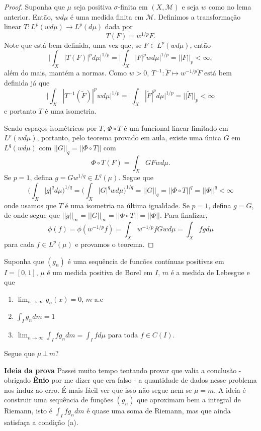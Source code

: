 \begin{proof}
    Suponha que $\mu$ seja positiva $\sigma$-finita em $(X, \mathcal{M})$ e seja $w$ como no lema anterior. Então, $wd\mu$ é uma medida
    finita em $\mathcal{M}$. Definimos a transformação linear $T: L^p(wd\mu) \to L^p(d\mu)$ dada por 
    $$T(F) = w^{1/p}F.$$
    Note que está bem definida, uma vez que, se $F \in L^p(wd\mu)$, então 
    $$\bigg|\int_X |T(F)|^p d\mu\bigg|^{1/p} = \bigg|\int_X |F|^p wd\mu\bigg|^{1/p} = ||F||_p < \infty,$$
    além do mais, mantém a normas. Como $w > 0$, $T^{-1}: \tilde{F} \mapsto w^{-1/p}\tilde{F}$ está bem definida já que 
    $$\bigg|\int_X |T^{-1}(\tilde{F})|^p wd\mu\bigg|^{1/p} = \bigg|\int_X |\tilde{F}|^p d\mu\bigg|^{1/p} = ||\tilde{F}||_p < \infty $$
    e portanto $T$ é uma isometria. 
    
    Sendo espaços isométricos por $T$, $\Phi \circ T$ é um funcional linear limitado em $L^p(wd\mu)$,
    portanto, pelo teorema provado em aula, existe uma única $G$ em $L^q(wd\mu)$ com $||G||_q = ||\Phi \circ T||$ com 
    $$\Phi \circ T (F) = \int_X GF wd\mu.$$
    Se $p = 1$, defina $g = Gw^{1/q} \in L^q(\mu)$. Segue que 
    $$\bigg(\int_X |g|^q d\mu\bigg)^{1/q} = \bigg(\int_X |G|^q w d\mu\bigg)^{1/q} = ||G||_q = ||\Phi \circ T||^q = ||\Phi||^q < \infty$$
    onde usamos que $T$ é uma isometria na última igualdade. Se $p = 1$, defina $g = G$,
    de onde segue que $||g||_\infty = ||G||_\infty = ||\Phi \circ T|| = ||\Phi||$. Para finalizar, 
    $$\phi(f) = \phi(w^{-1/p}f) = \int_X w^{-1/p}fGwd\mu = \int_X fg d\mu$$
    para cada $f \in L^p(\mu)$ e provamos o teorema.
\end{proof}

\begin{problem}
    \label{prob:l6:4}
    Suponha que $(g_n)$ é uma sequência de funcões contínuas positivas em $I = [0,1]$, $\mu$ é um medida positiva de Borel em $I$, $m$ é a medida de Lebesgue
    e que 
    \begin{enumerate}[label=(\alph*)]
        \item $\lim_{n\to\infty} g_n(x) = 0$, $m$-a.e
        \item $\int_I g_n dm = 1$
        \item $\lim_{n\to\infty} \int_I fg_ndm = \int_I fd\mu$ para toda $f \in C(I)$.
    \end{enumerate}
    Segue que $\mu\,\bot\,m$?
\end{problem}
\begin{remark}
    \textbf{Ideia da prova}
    Passei muito tempo tentando provar que valia a conclusão - obrigado \textbf{Ênio} por me dizer que era falso - a quantidade de dados nesse problema nos induz ao erro. É mais fácil ver 
    que isso não segue nem se $\mu = m$. 
    A ideia é construir uma sequência de funções $(g_n)$ que aproximam bem a integral de Riemann, isto é $\int_I fg_n dm$ é quase uma soma de Riemann,
    mas que ainda satisfaça a condição (a).
\end{remark}

